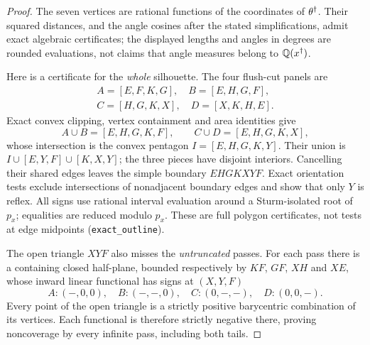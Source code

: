 \begin{proof}
The seven vertices are rational functions of the coordinates of $\theta^\dagger$. Their squared distances, and the angle cosines after the stated simplifications, admit exact algebraic certificates; the displayed lengths and angles in degrees are rounded evaluations, not claims that angle measures belong to $\mathbb{Q}(x^\dagger)$.

Here is a certificate for the \emph{whole} silhouette. The four flush-cut panels are
\begin{gather*}
A=[E,F,K,G],\quad B=[E,H,G,F],\\
C=[H,G,K,X],\quad D=[X,K,H,E].
\end{gather*}
Exact convex clipping, vertex containment and area identities give
\[
A\cup B=[E,H,G,K,F],\qquad C\cup D=[E,H,G,K,X],
\]
whose intersection is the convex pentagon $I=[E,H,G,K,Y]$.
Their union is $I\cup[E,Y,F]\cup[K,X,Y]$; the three pieces have disjoint interiors. Cancelling their shared edges leaves the simple boundary $EHGKXYF$. Exact orientation tests exclude intersections of nonadjacent boundary edges and show that only $Y$ is reflex. All signs use rational interval evaluation around a Sturm-isolated root of $p_x$; equalities are reduced modulo $p_x$. These are full polygon certificates, not tests at edge midpoints (\texttt{exact\_outline}).

The open triangle $XYF$ also misses the \emph{untruncated} passes. For each pass there is a containing closed half-plane, bounded respectively by $KF$, $GF$, $XH$ and $XE$, whose inward linear functional has signs at $(X,Y,F)$
\[
A:(-,0,0),\quad B:(-,-,0),\quad
C:(0,-,-),\quad D:(0,0,-).
\]
Every point of the open triangle is a strictly positive barycentric combination of its vertices. Each functional is therefore strictly negative there, proving noncoverage by every infinite pass, including both tails.
\end{proof}

